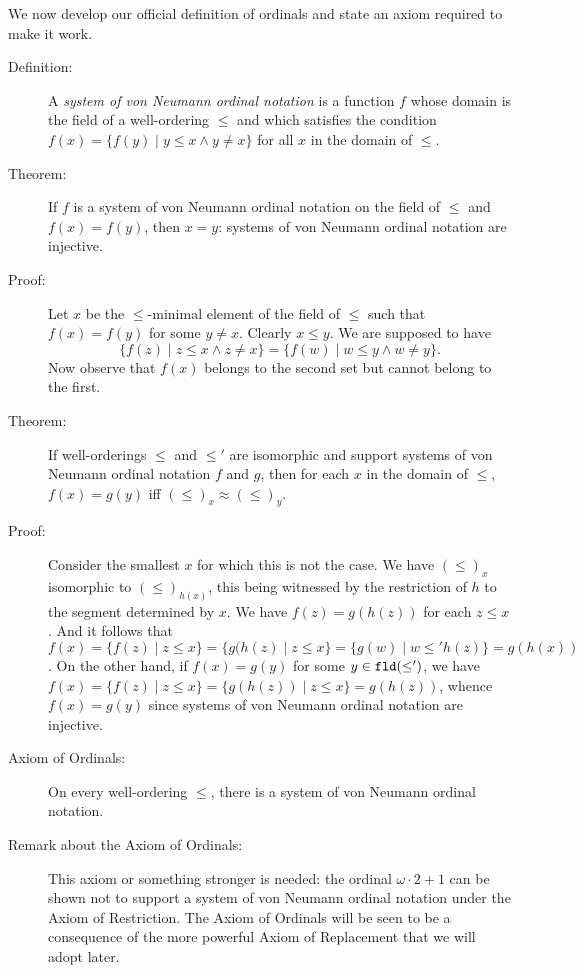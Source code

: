\documentclass[12pt]{book}
\begin{document}
We now develop our official definition of ordinals and state an axiom required to make it work.

\begin{description}

\item[Definition:]  A {\em system of von Neumann ordinal notation\/} is a function $f$ whose domain is the field of a well-ordering $\leq$ and which satisfies the condition $f(x) = \{f(y) \mid y \leq x \wedge y \neq x\}$ for all $x$ in the domain of $\leq$.

\item[Theorem:]  If $f$ is a system of von Neumann ordinal notation on the field of $\leq$ and $f(x)=f(y)$, then $x=y$: systems of von Neumann ordinal notation are injective.

\item[Proof:]  Let $x$ be the $\leq$-minimal element of the field of $\leq$ such that $f(x)=f(y)$ for some $y \neq x$.    Clearly $x \leq y$.  We are supposed to have
$$\{f(z) \mid z \leq x\wedge z \neq x\} = \{f(w) \mid w \leq y\wedge w \neq y\}.$$  Now observe that $f(x)$ belongs to the second set but cannot belong to the first.

\item[Theorem:]  If well-orderings $\leq$ and $\leq'$ are isomorphic and support systems of von Neumann ordinal notation $f$ and $g$,
then for each $x$ in the domain of $\leq$, $f(x) = g(y)$ iff $(\leq)_x \approx (\leq)_y$.

\item[Proof:]  Consider the smallest $x$ for which this is not the case.  We have $(\leq)_x$ isomorphic to $(\leq)_{h(x)}$, this being witnessed by the restriction of $h$ to the segment determined by $x$.  We have $f(z) = g(h(z))$ for each $z \leq x$.  And it follows that $f(x) = \{f(z) \mid z \leq x\} = \{g(h(z) \mid z \leq x\} = \{g(w) \mid w \leq' h(z)\} = g(h(x))$.  On the other hand, if $f(x) = g(y)$ for some $y \in {\tt fld}(\leq ')$, we have $f(x) = \{f(z) \mid z \leq x\} = \{g(h(z)) \mid z \leq x\} = g(h(z))$, whence $f(x)=g(y)$ since systems of von Neumann ordinal notation are injective.

\item[Axiom of Ordinals:]  On every well-ordering $\leq$, there is a system of von Neumann ordinal notation.

\item[Remark about the Axiom of Ordinals:]  This axiom or something stronger  is needed:  the ordinal $\omega \cdot 2+1$ can be shown not to support a system of von Neumann ordinal notation under the Axiom of Restriction.  The Axiom of Ordinals will be seen to be a consequence of the more powerful Axiom of Replacement that we will adopt later.


\end{description}
\end{document}
